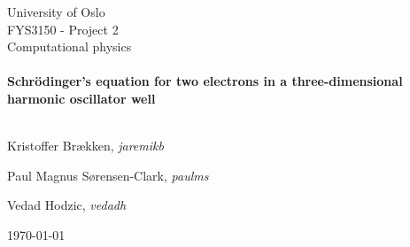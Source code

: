 
\begin{center}
    \LARGE University of Oslo\\[1.5cm]
    \Large FYS3150 - Project 2 \\ Computational physics\\[0.5cm]

    \HRule \\[0.4cm]

    { \huge \bfseries Schrödinger's equation for two electrons
		in a three-dimensional harmonic oscillator well\\[0.4cm] }

    \HRule \\[1.5cm]

    \large Kristoffer Brækken, \emph{jaremikb}

    \large Paul Magnus Sørensen-Clark, \emph{paulms}

    \large Vedad Hodzic, \emph{vedadh}

    \vfill

    {\large \today}
\end{center}
